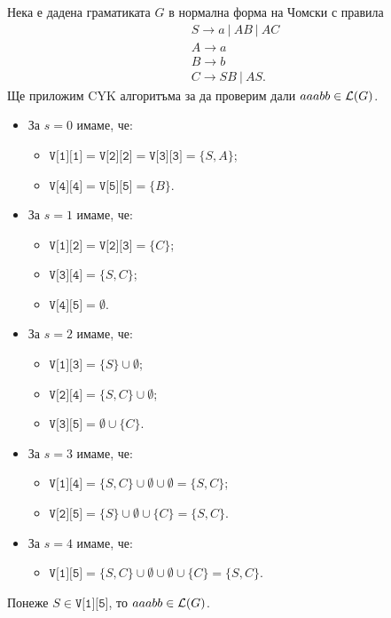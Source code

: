 {\scriptsize

\begin{multicols}{2}
  
\begin{example}
  Нека е дадена граматиката $G$ в нормална форма на Чомски с правила 
  \begin{align*}
    & S\rightarrow a\ |\ AB\ |\ AC\\
    & A\rightarrow a\\
    & B\rightarrow b\\
    & C\rightarrow SB\ |\ AS.
  \end{align*}
  Ще приложим CYK алгоритъма за да проверим дали $aaabb \in \mathcal{L}(G)$.
  
  \begin{itemize}
  \item 
    За $s = 0$ имаме, че:
    \begin{itemize}
    \item 
      $\texttt{V[1][1]} = \texttt{V[2][2]} = \texttt{V[3][3]} = \{S,A\}$;
    \item
      $\texttt{V[4][4]} = \texttt{V[5][5]} = \{B\}$.
    \end{itemize}
  \item
    За $s = 1$ имаме, че:
    \begin{itemize}
    \item
      $\texttt{V[1][2]} = \texttt{V[2][3]} = \{C\}$;
    \item
      $\texttt{V[3][4]} = \{S,C\}$;
    \item
      $\texttt{V[4][5]} = \emptyset$.
    \end{itemize}
  \item
    За $s = 2$ имаме, че:
    \begin{itemize}
    \item
      $\texttt{V[1][3]} = \{S\} \cup \emptyset$;
    \item
      $\texttt{V[2][4]} = \{S,C\} \cup \emptyset$;
    \item
      $\texttt{V[3][5]} = \emptyset \cup \{C\}$.
    \end{itemize}
  \item
    За $s = 3$ имаме, че:
    \begin{itemize}
    \item
      $\texttt{V[1][4]} = \{S,C\} \cup \emptyset \cup \emptyset = \{S,C\}$;
    \item
      $\texttt{V[2][5]} = \{S\} \cup \emptyset \cup \{C\} = \{S,C\}$.
    \end{itemize}
  \item
    За $s = 4$ имаме, че:
    \begin{itemize}
    \item 
      $\texttt{V[1][5]} = \{S,C\} \cup \emptyset \cup \emptyset \cup \{C\}= \{S,C\}$.
    \end{itemize}
  \end{itemize}
  Понеже $S \in \texttt{V[1][5]}$, то $aaabb \in \mathcal{L}(G)$.
\end{example}
\end{multicols}

}


